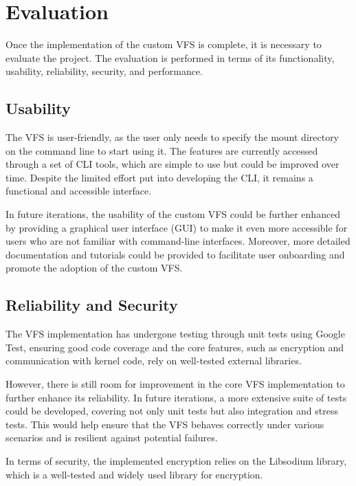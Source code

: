 \chapter{Evaluation}\label{chap:evaluation}

Once the implementation of the custom VFS is complete, it is necessary to evaluate the project.
The evaluation is performed in terms of its functionality, usability, reliability, security, and performance.


\section{Usability}\label{sec:usability}

The VFS is user-friendly, as the user only needs to specify the mount directory on the command line to start using it.
The features are currently accessed through a set of CLI tools, which are simple to use but could be improved over time.
Despite the limited effort put into developing the CLI, it remains a functional and accessible interface.

In future iterations, the usability of the custom VFS could be further enhanced by providing a graphical user interface (GUI) to make it even more accessible for users who are not familiar with command-line interfaces.
Moreover, more detailed documentation and tutorials could be provided to facilitate user onboarding and promote the adoption of the custom VFS\@.


\section{Reliability and Security}\label{sec:reliability-and-security}

The VFS implementation has undergone testing through unit tests using Google Test, ensuring good code coverage and the core features, such as encryption and communication with kernel code, rely on well-tested external libraries.

However, there is still room for improvement in the core VFS implementation to further enhance its reliability.
In future iterations, a more extensive suite of tests could be developed, covering not only unit tests but also integration and stress tests.
This would help ensure that the VFS behaves correctly under various scenarios and is resilient against potential failures.

In terms of security, the implemented encryption relies on the Libsodium library, which is a well-tested and widely used library for encryption.


